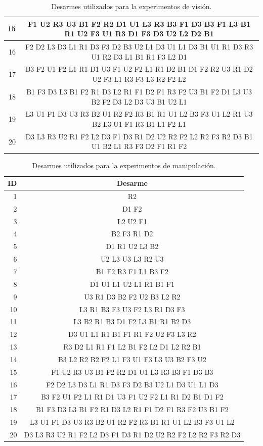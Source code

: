 \begin{table}
\begin{tabular}{|r|c|}
		15 & F1 U2 R3 U3 B1 F2 R2 D1 U1 L3 R3 B3 F1 D3 B3 F1 L3 B1 R1 U2 F3 U1 R3 D1 F3 D3 U2 L2 D2 B1 \\ \hline
		16 & F2 D2 L3 D3 L1 R1 D3 F3 D2 B3 U2 L1 D3 U1 L1 D3 B1 U1 R1 D3 R3 U1 R2 D3 L1 B1 R1 F3 L2 D1 \\ \hline
		17 & B3 F2 U1 F2 L1 R1 D1 U3 F1 U2 F2 L1 R1 D2 B1 D1 F2 R2 U3 R1 D2 U2 F3 L1 R3 F3 L3 R2 F2 L2 \\ \hline
		18 & B1 F3 D3 L3 B1 F2 R1 D3 L2 R1 F1 D2 F1 R3 F2 U3 B1 F2 D1 L3 U3 B2 F2 D3 L2 D3 U3 B1 U2 L1 \\ \hline
		19 & L3 U1 F1 D3 U3 R3 B2 U1 R2 F2 R3 B1 R1 U1 L2 B3 F3 U1 L2 R1 U3 B2 L3 U1 F1 R3 B1 L1 F2 L1 \\ \hline
		20 & D3 L3 R3 U2 R1 F2 L2 D3 F1 D3 R1 D2 U2 R2 F2 L2 R2 F3 R2 D3 B1 U1 B2 L1 R3 F3 D2 F1 R1 F2 \\ \hline
	\end{tabular}
	\caption{Desarmes utilizados para la experimentos de visión.}
	\label{vision}
\end{table}

\begin{table}
	\centering
	\begin{tabular}{|r|c|}
		\hline
		ID & Desarme \\ \hline \hline
		1 & R2 \\ \hline
		2 & D1 F2 \\ \hline
		3 & L2 U2 F1 \\ \hline
		4 & B2 F3 R1 D2 \\ \hline
		5 & D1 R1 U2 L3 B2 \\ \hline
		6 & U2 L3 U3 L3 R2 U3 \\ \hline
		7 & B1 F2 R3 F1 L1 B3 F2 \\ \hline
		8 & D1 U1 L1 U2 L1 R1 B1 F1 \\ \hline
		9 & U3 R1 D3 B2 F2 U2 B3 L2 R2 \\ \hline
	   10 & L3 R1 B3 F3 U3 F2 L3 R1 D3 F3 \\ \hline
	   11 & L3 B2 R1 B3 D1 F2 L3 B1 R1 B2 D3 \\ \hline
	   12 & D3 U1 L1 R1 B1 F1 R1 F2 U2 F3 L3 R2 \\ \hline
	   13 & R3 D2 L1 R1 F1 L2 B1 F2 L2 D1 L2 R2 B1 \\ \hline
	   14 & B3 L2 R2 B2 F2 L1 F3 U1 F3 L3 U3 B2 F3 U2 \\ \hline
	   15 & F1 U2 R3 U3 B1 F2 R2 D1 U1 L3 R3 B3 F1 D3 B3 \\ \hline
	   16 & F2 D2 L3 D3 L1 R1 D3 F3 D2 B3 U2 L1 D3 U1 L1 D3 \\ \hline
	   17 & B3 F2 U1 F2 L1 R1 D1 U3 F1 U2 F2 L1 R1 D2 B1 D1 F2 \\ \hline
	   18 & B1 F3 D3 L3 B1 F2 R1 D3 L2 R1 F1 D2 F1 R3 F2 U3 B1 F2 \\ \hline
	   19 & L3 U1 F1 D3 U3 R3 B2 U1 R2 F2 R3 B1 R1 U1 L2 B3 F3 U1 L2 \\ \hline
	   20 & D3 L3 R3 U2 R1 F2 L2 D3 F1 D3 R1 D2 U2 R2 F2 L2 R2 F3 R2 D3 \\ \hline
	\end{tabular}
	\caption{Desarmes utilizados para la experimentos de manipulación.}
	\label{manipulation}
\end{table}

